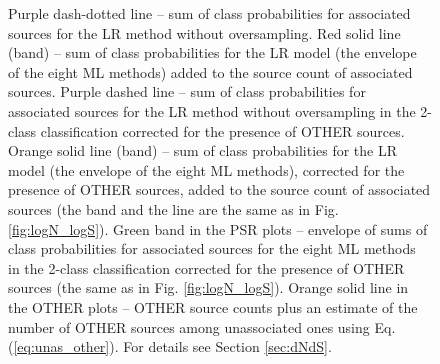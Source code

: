 \documentclass{aa}
\begin{document}
\begin{figure}[h]
{Purple dash-dotted line -- sum of class probabilities for associated sources for the LR method without oversampling.
Red solid line (band) -- sum of class probabilities for the LR model (the envelope of the eight ML methods) added to the source count of associated sources. 
Purple dashed line -- sum of class probabilities for associated sources for the LR method without oversampling in the 2-class classification corrected for the presence of OTHER sources.
Orange solid line (band) -- sum of class probabilities for the LR model (the envelope of the eight ML methods), corrected for the presence of OTHER sources, added to the source count of associated sources (the band and the line are the same as in Fig. \ref{fig:logN_logS}).
Green band in the PSR plots -- envelope of sums of class probabilities for associated sources for the eight ML methods in the 2-class classification corrected for the presence of OTHER sources (the same as in Fig. \ref{fig:logN_logS}).
Orange solid line in the OTHER plots -- OTHER source counts plus an estimate of the number of OTHER sources among unassociated ones using Eq. (\ref{eq:unas_other}). 
For details see Section \ref{sec:dNdS}.
}  
\label{fig:logN_logS_3classes}
\end{figure}
\end{document}

